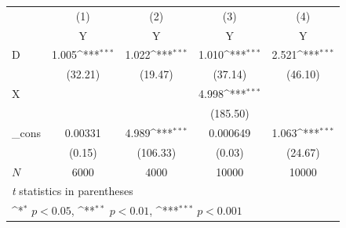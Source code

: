 {
\def\sym#1{\ifmmode^{#1}\else\(^{#1}\)\fi}
\begin{tabular}{l*{4}{c}}
\hline\hline
            &\multicolumn{1}{c}{(1)}&\multicolumn{1}{c}{(2)}&\multicolumn{1}{c}{(3)}&\multicolumn{1}{c}{(4)}\\
            &\multicolumn{1}{c}{Y}&\multicolumn{1}{c}{Y}&\multicolumn{1}{c}{Y}&\multicolumn{1}{c}{Y}\\
\hline
D           &       1.005\sym{***}&       1.022\sym{***}&       1.010\sym{***}&       2.521\sym{***}\\
            &     (32.21)         &     (19.47)         &     (37.14)         &     (46.10)         \\
[1em]
X           &                     &                     &       4.998\sym{***}&                     \\
            &                     &                     &    (185.50)         &                     \\
[1em]
\_cons      &     0.00331         &       4.989\sym{***}&    0.000649         &       1.063\sym{***}\\
            &      (0.15)         &    (106.33)         &      (0.03)         &     (24.67)         \\
\hline
\(N\)       &        6000         &        4000         &       10000         &       10000         \\
\hline\hline
\multicolumn{5}{l}{\footnotesize \textit{t} statistics in parentheses}\\
\multicolumn{5}{l}{\footnotesize \sym{*} \(p<0.05\), \sym{**} \(p<0.01\), \sym{***} \(p<0.001\)}\\
\end{tabular}
}
